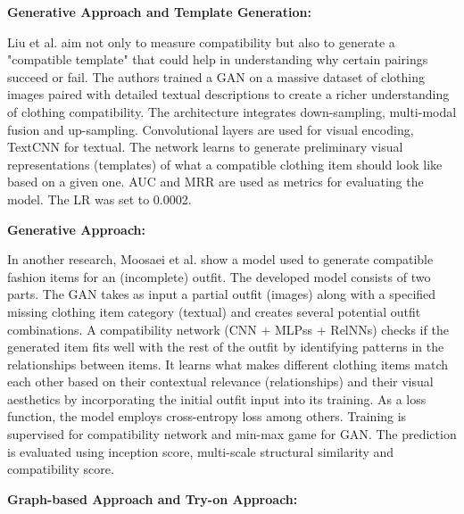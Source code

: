 \vspace{0.5cm}

\textbf{Generative Approach and Template Generation:}

\vspace{0.5cm}

Liu et al. aim not only to measure compatibility but also to generate a "compatible template" that could help in understanding why certain pairings succeed or fail. The authors trained a \acs{GAN} on a massive dataset of clothing images paired with detailed textual descriptions to create a richer understanding of clothing compatibility. The architecture integrates down-sampling, multi-modal fusion and up-sampling. Convolutional layers are used for visual encoding, TextCNN for textual. The network learns to generate preliminary visual representations (templates) of what a compatible clothing item should look like based on a given one. \acs{AUC} and \acs{MRR} are used as metrics for evaluating the model. The \acs{LR} was set to 0.0002. \cite[cf.]{liu_mgcm_2020}

\vspace{0.5cm}

\textbf{Generative Approach:}

\vspace{0.5cm}

In another research, Moosaei et al. show a model used to generate compatible fashion items for an (incomplete) outfit. The developed model consists of two parts. The \acs{GAN} takes as input a partial outfit (images) along with a specified missing clothing item category (textual) and creates several potential outfit combinations. A compatibility network (\acs{CNN} + \acsp{MLPs} + \acs{RelNNs}) checks if the generated item fits well with the rest of the outfit by identifying patterns in the relationships between items. It learns what makes different clothing items match each other based on their contextual relevance (relationships) and their visual aesthetics by incorporating the initial outfit input into its training. As a loss function, the model employs cross-entropy loss among others. Training is supervised for compatibility network and min-max game for \acs{GAN}. The prediction is evaluated using inception score, multi-scale structural similarity and compatibility score. \cite[cf.]{moosaei_outfitgan_2022}

\vspace{0.5cm}

\textbf{Graph-based Approach and Try-on Approach:}


